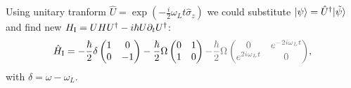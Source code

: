 Using unitary tranform $\hat{U} = \exp\left(
	- \frac{i}{2} \omega_L t \hat{\sigma}_z
\right)$ we could substitute $\left| \psi \right\rangle = \hat{U}^{\dag} |\tilde{\psi}\rangle$ and find new $H_{\textnormal{I}} = U H U^{\dag} - i \hbar U \partial_t U^{\dag}$:
\begin{equation*}
	\sub{\hat{H}}{I} = - \frac{\hbar}{2} \delta \begin{pmatrix}
	    1 & 0 \\
	    0 & -1 \\
	\end{pmatrix}
	 - \frac{\hbar}{2} \Omega \begin{pmatrix}
	     0 & 1 \\
	     1 & 0 \\
	 \end{pmatrix}
	 \grey{- \frac{\hbar}{2} \Omega \begin{pmatrix}
	     0 & e^{-2 i \omega_L t} \\
	     e^{2 i \omega_L t} & 0 \\
	 \end{pmatrix} },
\end{equation*}
with $\delta = \omega - \omega_L$.


